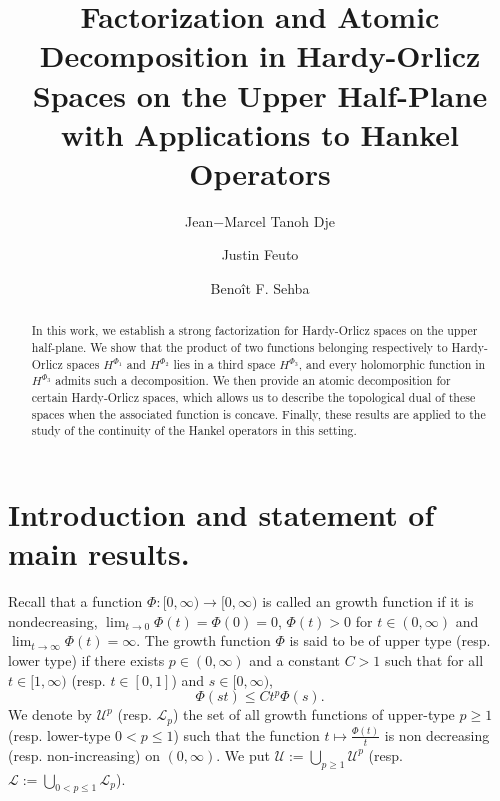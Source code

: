 \documentclass[a4paper,12pt,intlimits,oneside]{amsart}
\theoremstyle{definition}
\numberwithin{equation}{section}
\theoremstyle{definition}
\begin{document}
\title[Factorization and Atomic Decomposition]{Factorization and Atomic Decomposition in Hardy-Orlicz Spaces on the Upper Half-Plane with Applications to Hankel Operators}
\author[J.M. Tanoh Dje]{Jean$-$Marcel Tanoh Dje}
\address{Unit\'e de Recherche et d'Expertise Num\'erique, Universit\'e Virtuelle de C\^ote d'Ivoire, Cocody II-Plateaux - 28 BP 536 ABIDJAN 28}
\author[J. Feuto]{Justin Feuto}
\address{Laboratoire de Math\'ematiques et Applications, UFR Math\'ematiques$-$Informatique, Universit\'e F\'elix Houphou\"et-Boigny Abidjan-Cocody, 22 B.P 1194 Abidjan 22. C\^ote d'Ivoire}
\author[Beno\^it Sehba]{Beno\^it F. Sehba}
\address{Department of Mathematics, University of Ghana,\\ P. O. Box LG 62 Legon, Accra, Ghana}


\subjclass{}
\keywords{}

\date{}

\begin{abstract}
In this work, we establish a strong factorization for Hardy-Orlicz spaces on the upper half-plane. We show that the product of two functions belonging respectively to Hardy-Orlicz spaces $H^{\Phi_{1}}$ and $H^{\Phi_{2}}$ lies in a third space $H^{\Phi_{3}}$, and every holomorphic function in 
$H^{\Phi_{3}}$ admits such a decomposition. We then provide an atomic decomposition for certain Hardy-Orlicz spaces, which allows us to describe the topological dual of these spaces when the associated function is concave. Finally, these results are applied to the study of the continuity of the Hankel operators in this setting.
\end{abstract}

\maketitle



\section{Introduction and statement of main results.}

Recall that a function $\Phi : [0,\infty) \rightarrow [0,\infty)$ is called an growth function if it is nondecreasing, $\displaystyle\lim_{t \to 0} \Phi(t) =\Phi(0)= 0$, $\Phi(t) > 0$
for $t \in (0,\infty)$ and $\displaystyle\lim_{t \to \infty} \Phi(t) = \infty$.  The growth function  $\Phi$ is said to be of upper type (resp. lower type) if there exists  $p \in (0,\infty)$ and a constant $C>1$ such that for all $t \in  [1,\infty)$ (resp. $t \in  [0,1]$) and $s \in  [0,\infty)$,
\begin{equation}\label{eq:sui8n}
\Phi(st)\leq Ct^{p}\Phi(s).\end{equation}
We denote by $\mathscr{U}^{p}$ (resp. $\mathscr{L}_{p}$) the set of all growth functions of upper-type $p \geq 1$ (resp. lower-type $0< p\leq 1$) such that the function 
$t\mapsto \frac{\Phi(t)}{t}$ is non decreasing (resp. non-increasing) on $(0,\infty)$. We put
$   \mathscr{U}:=\bigcup_{p\geq 1}\mathscr{U}^{p}$ (resp. $\mathscr{L}:=\bigcup_{0< p\leq 1}\mathscr{L}_{p}$).
\end{document}
